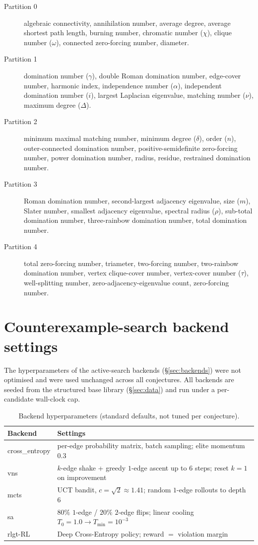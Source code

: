 \documentclass[]{ceurart}
\begin{document}
\begin{description}
  \item[Partition 0] algebraic connectivity, annihilation number, average degree, average
    shortest path length, burning number, chromatic number ($\chi$), clique number ($\omega$),
    connected zero-forcing number, diameter.
  \item[Partition 1] domination number ($\gamma$), double Roman domination number, edge-cover
    number, harmonic index, independence number ($\alpha$), independent domination number ($i$),
    largest Laplacian eigenvalue, matching number ($\nu$), maximum degree ($\Delta$).
  \item[Partition 2] minimum maximal matching number, minimum degree ($\delta$), order ($n$),
    outer-connected domination number, positive-semidefinite zero-forcing number, power domination
    number, radius, residue, restrained domination number.
  \item[Partition 3] Roman domination number, second-largest adjacency eigenvalue, size ($m$),
    Slater number, smallest adjacency eigenvalue, spectral radius ($\rho$), sub-total domination
    number, three-rainbow domination number, total domination number.
  \item[Partition 4] total zero-forcing number, triameter, two-forcing number, two-rainbow
    domination number, vertex clique-cover number, vertex-cover number ($\tau$), well-splitting
    number, zero-adjacency-eigenvalue count, zero-forcing number.
\end{description}

\section{Counterexample-search backend settings}
\label{app:hyperparams}
The hyperparameters of the active-search backends (\S\ref{sec:backends}) were not optimised and were used unchanged across all
conjectures. All backends are seeded from the structured base library (\S\ref{sec:data}) and run
under a per-candidate wall-clock cap.

\begin{table}[htbp]
  \caption{Backend hyperparameters (standard defaults, not tuned per conjecture).}
  \label{tab:hyperparams}
  \begin{tabular}{ll}
    \toprule
    Backend & Settings \\
    \midrule
    \textsf{cross\_entropy} & per-edge probability matrix, batch sampling; elite momentum $0.3$ \\
    \textsf{vns}            & $k$-edge shake + greedy $1$-edge ascent up to $6$ steps; reset $k{=}1$ on improvement \\
    \textsf{mcts}           & UCT bandit, $c=\sqrt{2}\approx1.41$; random $1$-edge rollouts to depth $6$ \\
    \textsf{sa}             & $80\%$ $1$-edge / $20\%$ $2$-edge flips; linear cooling $T_0=1.0\to T_{\min}=10^{-3}$ \\
    \textsf{rlgt-RL}        & Deep Cross-Entropy policy; reward $=$ violation margin \\
    \bottomrule
  \end{tabular}
\end{table}
\end{document}
